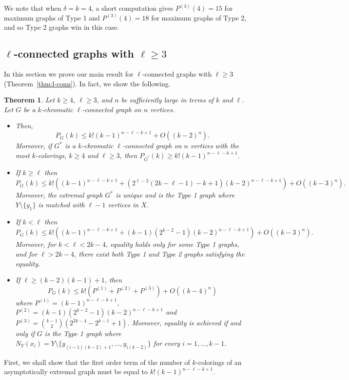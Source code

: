 \documentclass[11pt]{article}
\theoremstyle{plain}
\newtheorem{theorem}{Theorem}[section]
\theoremstyle{definition}
\theoremstyle{remark}
\begin{document}
We note that when $\delta=k=4$, a short computation gives $P^{(3)}(4) = 15$ for maximum graphs of Type 1 and $P^{(3)}(4) = 18$ for maximum graphs of Type 2, and so Type 2 graphs win in this case.


\subsection{$\ell$-connected graphs with $\ell \geq 3$}\label{sec:ell-con}

In this section we prove our main result for $\ell$-connected graphs with $\ell \geq 3$ (Theorem~\ref{thm:l-conn}). In fact, we show the following.

\begin{theorem}\label{thm:l-conn-stronger}
Let $k\ge 4$, $\ell \ge 3$, and $n$ be sufficiently large in terms of $k$ and $\ell$. Let $G$ be a $k$-chromatic $\ell$-connected graph on $n$ vertices.
\begin{itemize}
    \item [a)] Then,
\[P_G(k)\leq k!(k-1)^{n-\ell -k +1}+O((k-2)^n).\]
Moreover, if $G^*$ is a $k$-chromatic $\ell$-connected graph on $n$ vertices with the most $k$-colorings, $k\geq 4$ and $\ell \geq 3$, then $P_{G^*}(k)\geq k!(k-1)^{n- \ell -k +1}$.
    \item [b)] If $k\geq \ell$  then
\[P_G(k)\leq k!\left((k-1)^{n-\ell-k+1}+(2^{\ell -2}(2k-\ell -1)-k+1)(k-2)^{n-\ell-k+1}\right)+O((k-3)^n).\]
Moreover, the extremal graph $G^*$ is unique and is the Type 1 graph where $Y\setminus \{y_1\}$ is matched with $\ell-1$ vertices in $X$.
\item[c)] If $k< \ell$  then
\[P_G(k)\leq k!\left((k-1)^{n-\ell-k+1}+(k-1)(2^{k-2}-1)(k-2)^{n-\ell-k+1}\right)+O((k-3)^n).\]
Moreover, for $k< \ell < 2k-4$, equality holds only for some Type 1 graphs, and for $\ell > 2k-4$, there exist both Type 1 and Type 2 graphs satisfying the equality.
\item[d)] If $\ell \geq (k-2)(k-1)+1$, then
\[P_G(k)\leq k!(P^{(1)}+P^{(2)}+P^{(3)})+O((k-4)^n)\]
where $P^{(1)}=(k-1)^{n-\ell-k+1}$, $P^{(2)}=(k-1)(2^{k-2}-1)(k-2)^{n-\ell-k+1}$ and $P^{(3)}={k-1\choose 2}(2^{2k-4}-2^{k-1}+1)$.
Moreover, equality is achieved if and only if $G$ is the Type 1 graph where $N_Y(x_i)=Y\setminus \{y_{(i-1)(k-2)+1},\dots , y_{i(k-2)}\}$ for every $i=1,\dots ,k-1$.
\end{itemize}

\end{theorem}


First, we shall show that the first order term of the number of $k$-colorings of an asymptotically extremal graph must be equal to $k!(k-1)^{n-\ell -k+1}$.
\end{document}

